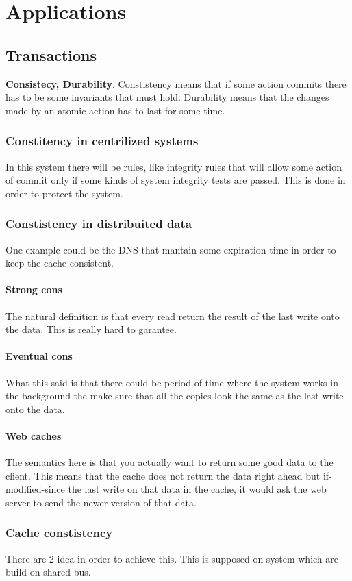 \documentclass{article}
\begin{document}
  \section{Applications}
    \subsection{Transactions}
      \textbf{Consistecy, Durability}. Constistency means that if some action commits there
      has to be some invariants that must hold. Durability means that the changes made by 
      an atomic action has to last for some time.
    \subsubsection{Constitency in centrilized systems}
      In this system there will be rules, like integrity rules that will allow some action 
      of commit only if some kinds of system integrity tests are passed. This is done in order
      to protect the system.
    \subsubsection{Constistency in distribuited data}
      One example could be the DNS that mantain some expiration time in order to keep the cache
      consistent.
      \paragraph{Strong cons} The natural definition is that every read return the result of 
        the last write onto the data. This is really hard to garantee. 
      \paragraph{Eventual cons} What this said is that there could be period of time where 
        the system works in the background the make sure that all the copies look the same 
        as the last write onto the data.
      \paragraph{Web caches} The semantics here is that you actually want to return some good 
        data to the client. This means that the cache does not return the data right ahead 
        but if-modified-since the last write on that data in the cache, it would ask the
        web server to send the newer version of that data.
    \subsubsection{Cache constistency}
      There are 2 idea in order to achieve this. This is supposed on system which are build 
      on shared bus.
\end{document}
